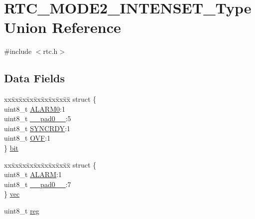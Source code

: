 \hypertarget{union_r_t_c___m_o_d_e2___i_n_t_e_n_s_e_t___type}{}\section{R\+T\+C\+\_\+\+M\+O\+D\+E2\+\_\+\+I\+N\+T\+E\+N\+S\+E\+T\+\_\+\+Type Union Reference}
\label{union_r_t_c___m_o_d_e2___i_n_t_e_n_s_e_t___type}


{\ttfamily \#include $<$rtc.\+h$>$}

\subsection*{Data Fields}
\begin{DoxyCompactItemize}
\item 
\begin{tabbing}
xx\=xx\=xx\=xx\=xx\=xx\=xx\=xx\=xx\=\kill
struct \{\\
\>uint8\_t \mbox{\hyperlink{union_r_t_c___m_o_d_e2___i_n_t_e_n_s_e_t___type_a5b88d7ce0817d8139138cfe94b5055d1}{ALARM0}}:1\\
\>uint8\_t \mbox{\hyperlink{union_r_t_c___m_o_d_e2___i_n_t_e_n_s_e_t___type_a8b4eebe79ded0459acec2f4950102ba3}{\_\_pad0\_\_}}:5\\
\>uint8\_t \mbox{\hyperlink{union_r_t_c___m_o_d_e2___i_n_t_e_n_s_e_t___type_aece75e176e4fd55bf68937f1b56bde63}{SYNCRDY}}:1\\
\>uint8\_t \mbox{\hyperlink{union_r_t_c___m_o_d_e2___i_n_t_e_n_s_e_t___type_ac6a3a2f132415ccc7b2b360497b74b15}{OVF}}:1\\
\} \mbox{\hyperlink{union_r_t_c___m_o_d_e2___i_n_t_e_n_s_e_t___type_a2e7e0ada2469b3268fb8f078a29f849a}{bit}}\\

\end{tabbing}\item 
\begin{tabbing}
xx\=xx\=xx\=xx\=xx\=xx\=xx\=xx\=xx\=\kill
struct \{\\
\>uint8\_t \mbox{\hyperlink{union_r_t_c___m_o_d_e2___i_n_t_e_n_s_e_t___type_a3c353493b89fa252249d2313097238f6}{ALARM}}:1\\
\>uint8\_t \mbox{\hyperlink{union_r_t_c___m_o_d_e2___i_n_t_e_n_s_e_t___type_a8b4eebe79ded0459acec2f4950102ba3}{\_\_pad0\_\_}}:7\\
\} \mbox{\hyperlink{union_r_t_c___m_o_d_e2___i_n_t_e_n_s_e_t___type_a83cb1976e01623b4b90c915df6013782}{vec}}\\

\end{tabbing}\item 
uint8\+\_\+t \mbox{\hyperlink{union_r_t_c___m_o_d_e2___i_n_t_e_n_s_e_t___type_a9428adc9af4653a2050e2536b55dec8d}{reg}}
\end{DoxyCompactItemize}


